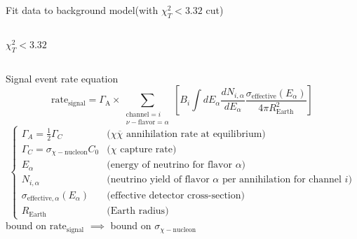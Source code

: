 \documentclass[14pt]{beamer}
\begin{document}
\begin{frame}{Fit data to background model}{(with $\chi^{2}_{T} < 3.32$ cut)}
\begin{columns}[t]
\begin{block}{\centering $\chi^{2}_{T} < 3.32$}
			\centering
		\end{block}
	\end{columns}
\end{frame}

\begin{frame}{Signal event rate equation}
	\begin{equation*}
		\text{rate}_{\text{signal}} = \Gamma_{\text{A}} \times
		\sum\limits_{\substack{\text{channel} = i\\ \nu-\text{flavor}= \alpha}}
		\left[
			B_{i} \int dE_{\alpha} \frac{dN_{i,\alpha}}{dE_{\alpha}}
			\frac{\sigma_{\text{effective}}(E_{\alpha})}
			{4\pi R_{\text{Earth}}^2}
		\right]
	\end{equation*}
	{\scriptsize
	\begin{equation*}
		\begin{cases}
			\Gamma_{A} = \frac{1}{2}\Gamma_{C}
				& \text{($\chi \overline{\chi}$ annihilation rate at equilibrium)}\\
			\Gamma_{C} = \sigma_{\chi-\text{nucleon}} C_{0}
				& \text{($\chi$ capture rate)}\\
			E_{\alpha}
				& \text{(energy of neutrino for flavor $\alpha$)}\\
			N_{i,\alpha}
				& \text{(neutrino yield of flavor $\alpha$ per annihilation for channel $i$)}\\
			\sigma_{\text{effective},\alpha}(E_{\alpha})
				& \text{(effective detector cross-section)}\\
			R_{\text{Earth}} & \text{(Earth radius)}
		\end{cases}
	\end{equation*}
	}
	bound on $\text{rate}_{\text{signal}}$
	$\implies$ bound on $\sigma_{\chi-\mathrm{nucleon}}$
\end{frame}
\end{document}
